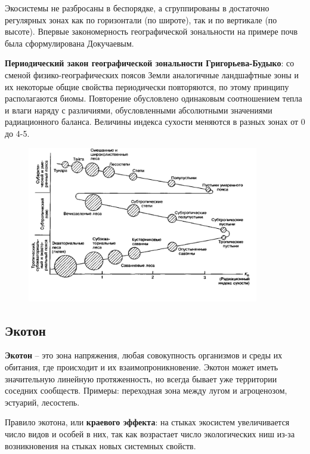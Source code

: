\documentclass[a5paper, 11pt]{extarticle}
\theoremstyle{definition}
\theoremstyle{definition}
\theoremstyle{definition}
\numberwithin{figure}{section}
\begin{document}
Экосистемы не разбросаны в беспорядке, а сгруппированы в достаточно регулярных зонах как по горизонтали (по широте), так и по вертикале (по высоте). Впервые закономерность географической зональности на примере почв была сформулирована Докучаевым.

\textbf{Периодический закон географической зональности Григорьева-Будыко}: со сменой физико-географических поясов Земли аналогичные ландшафтные зоны и их некоторые общие свойства периодически повторяются, по этому принципу располагаются биомы. Повторение обусловлено одинаковым соотношением тепла и влаги наряду с различиями, обусловленными абсолютными значениями радиационного баланса. Величины индекса сухости меняются в разных зонах от 0 до 4-5.

\begin{figure}[H]
    \centering
    \includegraphics[width=0.9\textwidth]{images/bioms-law.png}
\end{figure}

\subsection{Экотон}

\textbf{Экотон} -- это зона напряжения, любая совокупность организмов и среды их обитания, где происходит и их взаимопроникновение. Экотон может иметь значительную линейную протяженность, но всегда бывает уже территории соседних сообществ. Примеры: переходная зона между лугом и агроценозом, эстуарий, лесостепь.

Правило экотона, или \textbf{краевого эффекта}: на стыках экосистем увеличивается число видов и особей в них, так как возрастает число экологических ниш из-за возникновения на стыках новых системных свойств.
\end{document}
